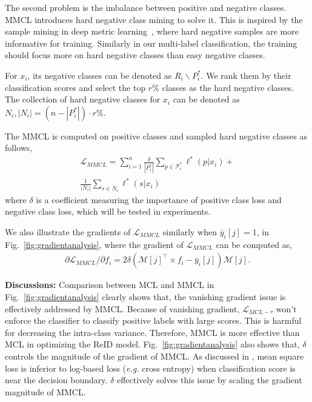 \documentclass[10pt,twocolumn,letterpaper]{article}
\begin{document}
The second problem is the imbalance between positive and negative classes. MMCL introduces hard negative class mining to solve it. This is inspired by the sample mining in deep metric learning~\cite{wu2017sampling}, where hard negative samples are more informative for training. Similarly in our multi-label classification, the training should focus more on hard negative classes than easy negative classes.

For $x_i$, its negative classes can be denoted as $R_{i} \backslash P^*_{i}$. We rank them by their classification scores and select the top $r\%$ classes as the hard negative classes. The collection of hard negative classes for $x_i$ can be denoted as ${N}_{i}, |{N}_{i}|=(n-|P^*_{i}|)\cdot r\%$.

The MMCL is computed on positive classes and sampled hard negative classes as follows, \begin{equation}\label{mmcl}
\begin{aligned}
\mathcal{L}_{MMCL} = \sum_{i=1}^{n} \frac{\delta}{|{P}^*_{i}|}\sum_{p \in \mathcal{P}^*_{i}}\ell^*(p|x_i) + \\
 \frac{1}{|{N}_{i}|}\sum_{s \in {N}_{i}}\ell^*(s|x_i)
 \end{aligned}
\end{equation}
where $\delta$ is a coefficient measuring the importance of positive class loss and negative class loss, which will be tested in experiments.

We also illustrate the gradients of $\mathcal{L}_{MMCL}$ similarly when $\bar y_i[j]=1$, in Fig.~\ref{fig:gradientanalysis}, where the gradient of $\mathcal{L}_{MMCL}$ can be computed as,
\begin{equation}
\begin{aligned}
\partial{\mathcal{L}_{MMCL}}/{\partial{f_i}}= 2\delta (\mathcal{M}[j]^\top \times f_i -\bar y_i[j])\mathcal{M}[j].
 \end{aligned}
\end{equation}

\textbf{Discussions:} Comparison between MCL and MMCL in Fig.~\ref{fig:gradientanalysis} clearly shows that, the vanishing gradient issue is effectively addressed by MMCL. Because of vanishing gradient, $\mathcal{L}_{MCL-\tau}$ won't enforce the classifier to classify positive labels with large scores. This is harmful for decreasing the intra-class variance. Therefore, MMCL is more effective than MCL in optimizing the ReID model. Fig.~\ref{fig:gradientanalysis} also shows that, $\delta$ controls the magnitude of the gradient of MMCL. As discussed in \cite{NIPS2018_8094}, mean square loss is inferior to log-based loss (\emph{e.g.} cross entropy) when classification score is near the decision boundary. $\delta$ effectively solves this issue by scaling the gradient magnitude of MMCL.
\end{document}
